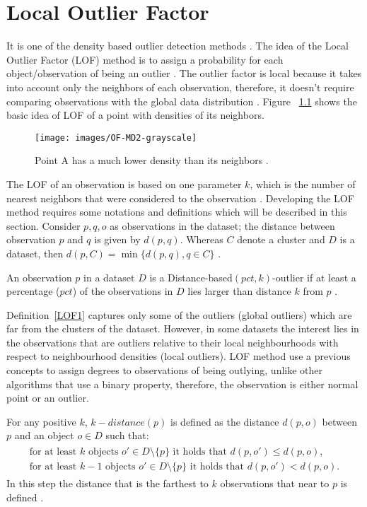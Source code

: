 \chapter{Local Outlier Factor} \label{LOF} \label{Local_Outlier_Factor}
It is one of the density based outlier detection methods \citep{Silvia}. The idea of the Local Outlier Factor (LOF) method is to assign a probability for each object/observation of being an outlier \citep{Markus}. The outlier factor is local because it takes into account only the neighbors of each observation, therefore, it doesn't require comparing observations with the global data distribution \citep{LOF}. Figure ~\ref{LOF-MD2} shows the basic idea of LOF of a point with densities of its neighbors.
 \begin{figure}[!h]
 \centering 
 \texttt{[image: images/OF-MD2-grayscale]}
 \caption{Point A has a much lower density than its neighbors \citep{LOF}.}
 \label{LOF-MD2} 
 \end{figure}
 
The LOF of an observation is based on one parameter $k$, which is the number of nearest neighbors that were considered to the observation \citep{Markus}. Developing the LOF method requires some notations and definitions which will be described in this section. Consider $p,q,o$ as observations in the dataset; the distance between observation $p$ and $q$ is given by $d(p,q)$. Whereas $C$ denote a cluster and $D$ is a dataset, then $d(p,C)=\min\{d(p,q),q\in C\}$ \citep{Knorr}.

\begin{defn} \label{LOF1} An observation $p$ in a dataset $D$ is a Distance-based$(pct,k)$-outlier if at least a percentage ($pct$) of the observations in $D$ lies larger than distance $k$ from $p$ \citep{Markus}.
\end{defn}
Definition~\ref{LOF1} captures only some of the outliers (global outliers) which are far from the clusters of the dataset. However, in some datasets the interest lies in the observations that are outliers relative to their local neighbourhoods with respect to neighbourhood densities (local outliers). LOF method use a previous concepts to assign degrees to observations of being outlying, unlike other algorithms that use a binary property, therefore, the observation is either normal point or an outlier.
\begin{defn} \label{LOF2} For any positive $k$, $k-distance(p)$ is defined as the distance $d(p,o)$ between $p$ and an object $o \in D$ such that:
\begin{align}
\label{a}
\begin{gathered}
\text{for at least $k$ objects } o' \in D \setminus \{p\} \text{ it holds that } d(p,o') \leq d(p,o), \\ \text{for at least $k-1$ objects } o' \in D \setminus \{p\} \text{ it holds that } d(p,o') < d(p,o).
\end{gathered} 
\end{align}
In this step the distance that is the farthest to $k$ observations that near to $p$ is defined \citep{Markus}.
\end{defn}

